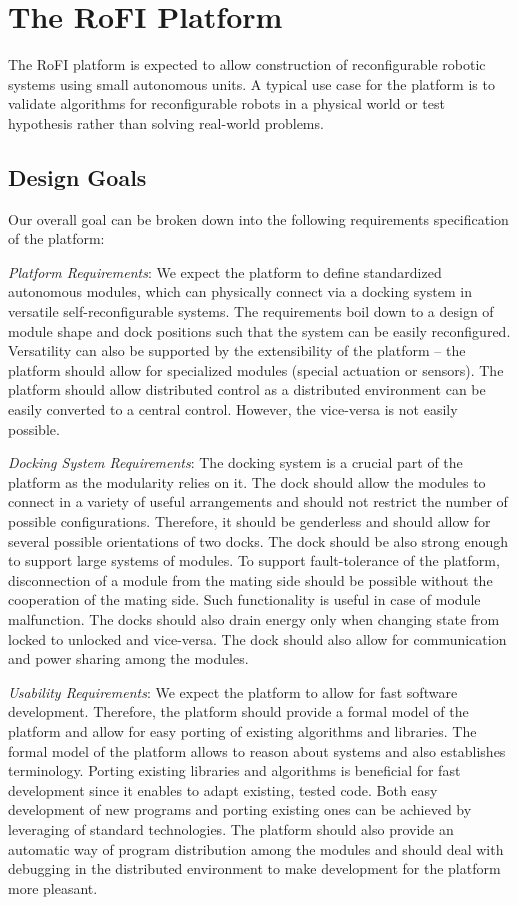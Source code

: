 \chapter{The RoFI Platform}\label{chap:rofi}

The RoFI platform is expected to allow construction of reconfigurable robotic
systems using small autonomous units. A typical use case for the platform is to
validate algorithms for reconfigurable robots in a physical world or test
hypothesis rather than solving real-world problems.

\section{Design Goals}\label{sec:design_goals}

Our overall goal can be broken down into the following requirements
specification of the platform:

\emph{Platform Requirements}: We expect the platform to define standardized
autonomous modules, which can physically connect via a docking system in
versatile self-reconfigurable systems. The requirements boil down to a design of
module shape and dock positions such that the system can be easily reconfigured.
Versatility can also be supported by the extensibility of the platform -- the
platform should allow for specialized modules (special actuation or sensors).
The platform should allow distributed control as a distributed environment can
be easily converted to a central control. However, the vice-versa is not easily
possible.

\emph{Docking System Requirements}: The docking system is a crucial part of the
platform as the modularity relies on it. The dock should allow the modules to
connect in a variety of useful arrangements and should not restrict the number
of possible configurations. Therefore, it should be genderless and should allow
for several possible orientations of two docks. The dock should be also strong
enough to support large systems of modules. To support fault-tolerance of the
platform, disconnection of a module from the mating side should be possible
without the cooperation of the mating side. Such functionality is useful in case
of module malfunction. The docks should also drain energy only when changing
state from locked to unlocked and vice-versa. The dock should also allow for
communication and power sharing among the modules.

\emph{Usability Requirements}: We expect the platform to allow for fast software
development. Therefore, the platform should provide a formal model of the
platform and allow for easy porting of existing algorithms and libraries. The
formal model of the platform allows to reason about systems and also establishes
terminology. Porting existing libraries and algorithms is beneficial for fast
development since it enables to adapt existing, tested code. Both easy
development of new programs and porting existing ones can be achieved by
leveraging of standard technologies. The platform should also provide an
automatic way of program distribution among the modules and should deal with
debugging in the distributed environment to make development for the platform
more pleasant.

